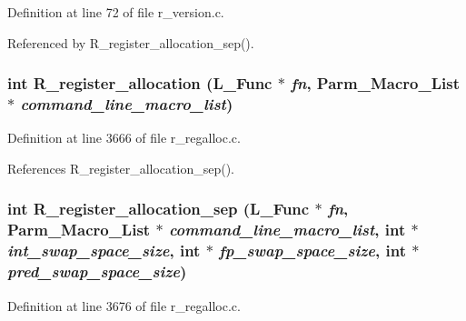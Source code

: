 Definition at line 72 of file r\_\-version.c.

Referenced by R\_\-register\_\-allocation\_\-sep().
\subsubsection{\setlength{\rightskip}{0pt plus 5cm}int R\_\-register\_\-allocation (L\_\-Func $\ast$ {\em fn}, \bf{Parm\_\-Macro\_\-List} $\ast$ {\em command\_\-line\_\-macro\_\-list})}\label{r__regproto_8h_766b8fbafc0b01f083fcbf6dbd406441}




Definition at line 3666 of file r\_\-regalloc.c.

References R\_\-register\_\-allocation\_\-sep().
\subsubsection{\setlength{\rightskip}{0pt plus 5cm}int R\_\-register\_\-allocation\_\-sep (L\_\-Func $\ast$ {\em fn}, \bf{Parm\_\-Macro\_\-List} $\ast$ {\em command\_\-line\_\-macro\_\-list}, int $\ast$ {\em int\_\-swap\_\-space\_\-size}, int $\ast$ {\em fp\_\-swap\_\-space\_\-size}, int $\ast$ {\em pred\_\-swap\_\-space\_\-size})}\label{r__regproto_8h_014ca179f5a83645a5b7758081eddcb5}




Definition at line 3676 of file r\_\-regalloc.c.

